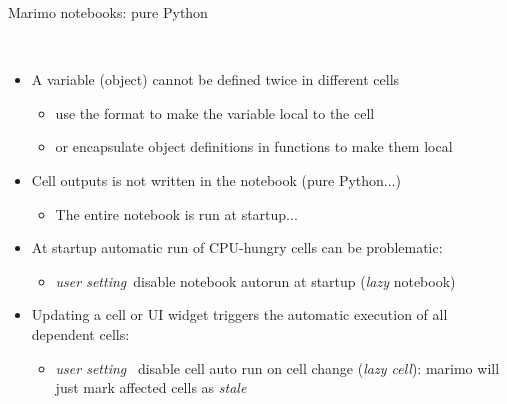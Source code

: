 \documentclass[11pt, serif, mathserif, compress]{beamer}  %
\begin{document}
\begin{frame}{Marimo notebooks: pure Python}

  \begin {bclogo}[noborder=true, couleur=gray!20, couleurBarre=Chocolate, logo=\raisebox{1mm}{\,\huge🤕}, marge=0, margeG=-0.5, margeD=-0.8]
    {\ }
    \smallskip

    \begin{itemize}\setlength\itemsep{3mm}

    \item<2-> A variable (object) cannot be defined twice in different cells

      \begin{itemize}\setlength\itemsep{1mm}        
      \item<3-> use the format  to make the variable local to the cell
      \item<3-> or encapsulate object definitions in functions to make them local
      \end{itemize}

    \item<4-> Cell outputs is not written in the notebook (pure Python...)

      \begin{itemize}\setlength\itemsep{3mm}        
      \item<5-> The entire notebook is run at startup... 
      \end{itemize}
      
    \item<6-> At startup automatic run of CPU-hungry cells can be problematic:\\

      \begin{itemize}\setlength\itemsep{3mm}        
      \item<7-> {\em user setting} \Forward\,disable notebook autorun at startup ({\em lazy} notebook)
      \end{itemize}
      
    \item<10-> Updating a cell or UI widget triggers the automatic execution of all dependent cells:\\
    
      \begin{itemize}\setlength\itemsep{3mm}        
      \item<11,13> {\em user setting} \Forward\, disable cell auto run on cell change ({\em lazy cell}): 
      marimo will just mark affected cells as {\em stale}
    \end{itemize}


\end{itemize}
\end{bclogo}
\end{frame}
\end{document}
